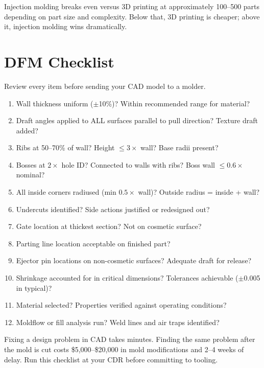 \documentclass[11pt,letterpaper,twoside,openany]{book}
\begin{document}
Injection molding breaks even versus 3D printing at approximately 100--500 parts depending on part size and complexity. Below that, 3D printing is cheaper; above it, injection molding wins dramatically.


\FloatBarrier
\section{DFM Checklist}
\label{sec:checklist}

Review every item before sending your CAD model to a molder.

\begin{enumerate}[leftmargin=1.5em]
  \item Wall thickness uniform ($\pm$10\%)? Within recommended range for material?
  \item Draft angles applied to ALL surfaces parallel to pull direction? Texture draft added?
  \item Ribs at 50--70\% of wall? Height $\leq 3\times$ wall? Base radii present?
  \item Bosses at $2\times$ hole ID? Connected to walls with ribs? Boss wall $\leq 0.6\times$ nominal?
  \item All inside corners radiused (min $0.5\times$ wall)? Outside radius = inside + wall?
  \item Undercuts identified? Side actions justified or redesigned out?
  \item Gate location at thickest section? Not on cosmetic surface?
  \item Parting line location acceptable on finished part?
  \item Ejector pin locations on non-cosmetic surfaces? Adequate draft for release?
  \item Shrinkage accounted for in critical dimensions? Tolerances achievable ($\pm$0.005\,in typical)?
  \item Material selected? Properties verified against operating conditions?
  \item Moldflow or fill analysis run? Weld lines and air traps identified?
\end{enumerate}

\begin{warningbox}
Fixing a design problem in CAD takes minutes. Finding the same problem after the mold is cut costs \$5,000--\$20,000 in mold modifications and 2--4 weeks of delay. Run this checklist at your CDR before committing to tooling.
\end{warningbox}
\end{document}
